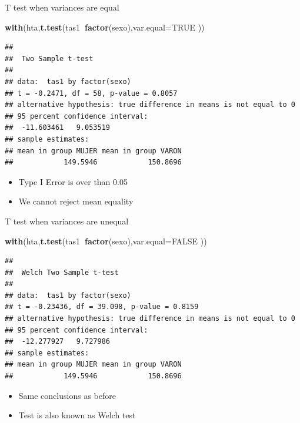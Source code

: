 \documentclass[
  ignorenonframetext,
]{beamer}
\newenvironment{Shaded}{\begin{snugshade}}{\end{snugshade}}
\newcommand{\DataTypeTok}[1]{\textcolor[rgb]{0.13,0.29,0.53}{#1}}
\newcommand{\KeywordTok}[1]{\textcolor[rgb]{0.13,0.29,0.53}{\textbf{#1}}}
\newcommand{\NormalTok}[1]{#1}
\newcommand{\OperatorTok}[1]{\textcolor[rgb]{0.81,0.36,0.00}{\textbf{#1}}}
\newcommand{\OtherTok}[1]{\textcolor[rgb]{0.56,0.35,0.01}{#1}}
\providecommand{\tightlist}{%
  \setlength{\itemsep}{0pt}\setlength{\parskip}{0pt}}
\begin{document}
\begin{frame}[fragile]{T test when variances are equal}
\protect\hypertarget{t-test-when-variances-are-equal}{}

\small

\begin{Shaded}
\begin{Highlighting}[]
\KeywordTok{with}\NormalTok{(hta,}\KeywordTok{t.test}\NormalTok{(tas1}\OperatorTok{~}\KeywordTok{factor}\NormalTok{(sexo),}\DataTypeTok{var.equal=}\OtherTok{TRUE}\NormalTok{ ))}
\end{Highlighting}
\end{Shaded}

\begin{verbatim}
## 
##  Two Sample t-test
## 
## data:  tas1 by factor(sexo)
## t = -0.2471, df = 58, p-value = 0.8057
## alternative hypothesis: true difference in means is not equal to 0
## 95 percent confidence interval:
##  -11.603461   9.053519
## sample estimates:
## mean in group MUJER mean in group VARON 
##            149.5946            150.8696
\end{verbatim}

\begin{itemize}
\tightlist
\item
  Type I Error is over than 0.05
\item
  We cannot reject mean equality
\end{itemize}

\end{frame}

\begin{frame}[fragile]{T test when variances are unequal}
\protect\hypertarget{t-test-when-variances-are-unequal}{}

\small

\begin{Shaded}
\begin{Highlighting}[]
\KeywordTok{with}\NormalTok{(hta,}\KeywordTok{t.test}\NormalTok{(tas1}\OperatorTok{~}\KeywordTok{factor}\NormalTok{(sexo),}\DataTypeTok{var.equal=}\OtherTok{FALSE}\NormalTok{ ))}
\end{Highlighting}
\end{Shaded}

\begin{verbatim}
## 
##  Welch Two Sample t-test
## 
## data:  tas1 by factor(sexo)
## t = -0.23436, df = 39.098, p-value = 0.8159
## alternative hypothesis: true difference in means is not equal to 0
## 95 percent confidence interval:
##  -12.277927   9.727986
## sample estimates:
## mean in group MUJER mean in group VARON 
##            149.5946            150.8696
\end{verbatim}

\begin{itemize}
\tightlist
\item
  Same conclusions as before
\item
  Test is also known as Welch test
\end{itemize}

\end{frame}
\end{document}
